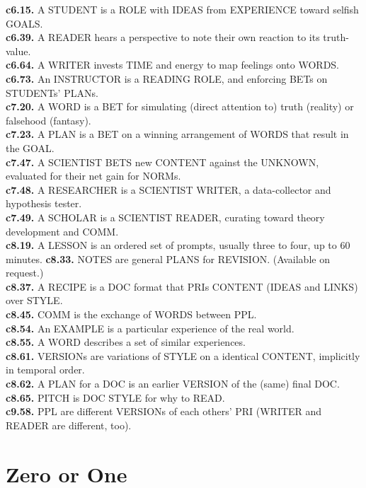\documentclass[
]{book}
\begin{document}
\textbf{c6.15.} A STUDENT is a ROLE with IDEAS from EXPERIENCE toward selfish GOALS.\\
\textbf{c6.39.} A READER hears a perspective to note their own reaction to its truth-value.\\
\textbf{c6.64.} A WRITER invests TIME and energy to map feelings onto WORDS.\\
\textbf{c6.73.} An INSTRUCTOR is a READING ROLE, and enforcing BETs on STUDENTs' PLANs.\\
\textbf{c7.20.} A WORD is a BET for simulating (direct attention to) truth (reality) or falsehood (fantasy).\\
\textbf{c7.23.} A PLAN is a BET on a winning arrangement of WORDS that result in the GOAL.\\
\textbf{c7.47.} A SCIENTIST BETS new CONTENT against the UNKNOWN, evaluated for their net gain for NORMs.\\
\textbf{c7.48.} A RESEARCHER is a SCIENTIST WRITER, a data-collector and hypothesis tester.\\
\textbf{c7.49.} A SCHOLAR is a SCIENTIST READER, curating toward theory development and COMM.\\
\textbf{c8.19.} A LESSON is an ordered set of prompts, usually three to four, up to 60 minutes.
\textbf{c8.33.} NOTES are general PLANS for REVISION. (Available on request.)\\
\textbf{c8.37.} A RECIPE is a DOC format that PRIs CONTENT (IDEAS and LINKS) over STYLE.\\
\textbf{c8.45.} COMM is the exchange of WORDS between PPL.\\
\textbf{c8.54.} An EXAMPLE is a particular experience of the real world.\\
\textbf{c8.55.} A WORD describes a set of similar experiences.\\
\textbf{c8.61.} VERSIONs are variations of STYLE on a identical CONTENT, implicitly in temporal order.\\
\textbf{c8.62.} A PLAN for a DOC is an earlier VERSION of the (same) final DOC.\\
\textbf{c8.65.} PITCH is DOC STYLE for why to READ.\\
\textbf{c9.58.} PPL are different VERSIONs of each others' PRI (WRITER and READER are different, too).

\hypertarget{appendix-lessons}{%
\appendix}


\hypertarget{zero-or-one}{%
\chapter{Zero or One}\label{zero-or-one}}
\end{document}

